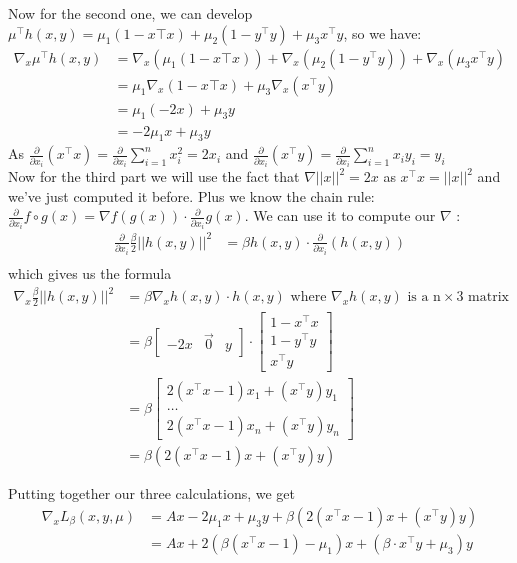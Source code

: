 \documentclass{article}
\newcommand{\tp}{^\top}
\newcommand{\p}{\frac{\partial}{\partial x_i}}
\begin{document}
Now for the second one, we can develop $\mu\tp h(x,y)=\mu_1 (1-x\top x)+\mu_2(1-y\tp y) + \mu_3 x\tp y$, so we have:
\begin{align*}
\nabla_x \mu\tp h(x,y)&=\nabla_x (\mu_1 (1-x\top x))+\nabla_x (\mu_2(1-y\tp y)) +\nabla_x ( \mu_3 x\tp y)\\
&=\mu_1 \nabla_x (1-x\top x) + \mu_3 \nabla_x ( x\tp y)\\
&= \mu_1 (-2x) + \mu_3 y\\
&= - 2\mu_1 x+\mu_3 y
\end{align*}
As $\p(x\tp x)=\p \sum_{i=1}^n x_i^2=2x_i$ and  $\p(x\tp y)=\p \sum_{i=1}^n x_i y_i=y_i$\\

Now for the third part we will use the fact that $\nabla||x||^2=2x$ as $x\tp x=||x||^2$ and we've just computed it before. Plus we know the chain rule: $\p f\circ g(x)= \nabla f (g(x)) \cdot \p g(x)$. We can use it to compute our $\nabla$ :
\begin{align*}
\p \frac{\beta}{2} ||h(x,y)||^2&=\beta h(x,y) \cdot \p(h(x,y))\\
\end{align*}
which gives us the formula
\begin{align*}
\nabla_x \frac{\beta}{2} ||h(x,y)||^2&=\beta \nabla_x h(x,y) \cdot  h(x,y) \text{ where } \nabla_x h(x,y) \text{ is a n} \times \text{3 matrix}\\
&=\beta\begin{bmatrix} -2x & \vec 0 & y \end{bmatrix}   \cdot \begin{bmatrix} 1-x\tp x \\ 1-y\tp y\\ x\tp y \end{bmatrix} \\
&=\beta\begin{bmatrix}2(x\tp x-1) x_1+(x\tp y )y_1\\ \dots \\ 2(x\tp x-1) x_n+(x\tp y )y_n \end{bmatrix}\\
&=\beta \left( 2(x\tp x-1)  x+(x\tp y ) y \right) 
\end{align*}

Putting together our three calculations, we get
\begin{align*}
\nabla_x L_\beta(x,y,\mu)&=Ax - 2\mu_1 x+\mu_3 y+\beta \left( 2(x\tp x-1) x+(x\tp y ) y \right) \\
&=Ax+ 2(\beta (x\tp x-1) - \mu_1) x +(\beta \cdot x\tp y + \mu_3)y
\end{align*}
\end{document}
